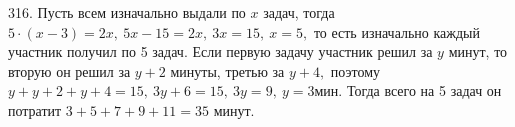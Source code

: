 316. Пусть всем изначально выдали по $x$ задач, тогда $5\cdot(x-3)=2x,\ 5x-15=2x,\ 3x=15,\ x=5,$ то есть изначально каждый участник получил по 5 задач. Если первую задачу участник решил за $y$ минут, то вторую он решил за $y+2$ минуты, третью за $y+4,$ поэтому $y+y+2+y+4=15,\ 3y+6=15,\ 3y=9,\ y=3$мин. Тогда всего на 5 задач он потратит $3+5+7+9+11=35$ минут.\\
